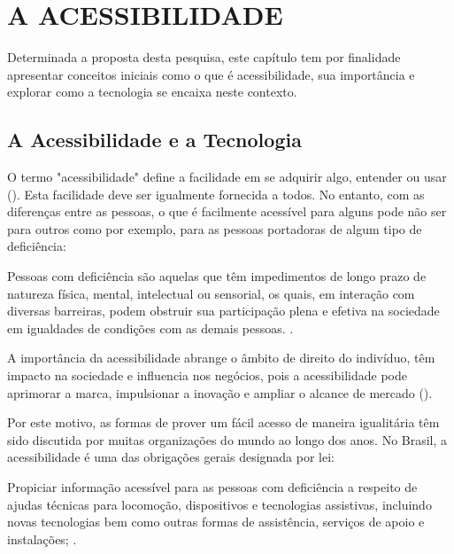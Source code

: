 
\chapter{A ACESSIBILIDADE}
\label{chap:fundamentacaoTeorica}

Determinada a proposta desta pesquisa, este capítulo tem por finalidade apresentar conceitos iniciais como o que é acessibilidade, sua importância e explorar como a tecnologia se encaixa neste contexto.

\section{A Acessibilidade e a Tecnologia}
\label{sec:}

O termo "acessibilidade" define a facilidade em se adquirir algo, entender ou usar (). Esta facilidade deve ser igualmente fornecida a todos. No entanto, com as diferenças entre as pessoas, o que é facilmente acessível para alguns pode não ser para outros como por exemplo, para as pessoas portadoras de algum tipo de deficiência:\\
\begin{citacao}
    Pessoas com deficiência são aquelas que têm impedimentos de longo prazo de natureza física, mental, intelectual ou sensorial, os quais, em interação com diversas barreiras, podem obstruir sua participação plena e efetiva na sociedade em igualdades de condições com as demais pessoas. \cite[art. 1]{decreto2009}.
\end{citacao}

A importância da acessibilidade abrange o âmbito de direito do indivíduo, têm impacto na sociedade e influencia nos negócios, pois a acessibilidade pode aprimorar a marca, impulsionar a inovação e ampliar o alcance de mercado ().

Por este motivo, as formas de prover um fácil acesso de maneira igualitária têm sido discutida por muitas organizações do mundo ao longo dos anos. No Brasil, a acessibilidade é uma das obrigações gerais designada por lei:
\begin{citacao}
    Propiciar informação acessível para as pessoas com deficiência a respeito de ajudas técnicas para locomoção, dispositivos e tecnologias assistivas, incluindo novas tecnologias bem como outras formas de assistência, serviços de apoio e instalações; \cite[art. 4]{decreto2009}.
\end{citacao}

